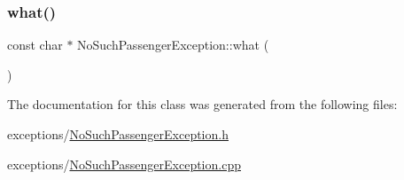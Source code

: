 \subsubsection{\texorpdfstring{what()}{what()}}
{\footnotesize\ttfamily const char $\ast$ No\+Such\+Passenger\+Exception\+::what (\begin{DoxyParamCaption}{ }\end{DoxyParamCaption})}



The documentation for this class was generated from the following files\+:\begin{DoxyCompactItemize}
\item 
exceptions/\mbox{\hyperlink{NoSuchPassengerException_8h}{No\+Such\+Passenger\+Exception.\+h}}\item 
exceptions/\mbox{\hyperlink{NoSuchPassengerException_8cpp}{No\+Such\+Passenger\+Exception.\+cpp}}\end{DoxyCompactItemize}

